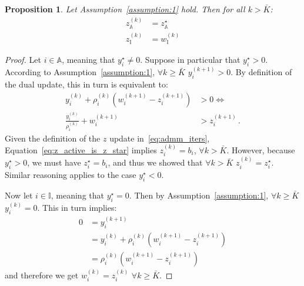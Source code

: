 \documentclass[letterpaper, 10 pt, conference]{ieeeconf}  %
\newtheorem{proposition}{Proposition}
\begin{document}
\begin{proposition}
\label{prop:assumption_1}
Let Assumption~\ref{assumption:1} hold. Then for all $k > \bar{K}$:
\begin{equation}
\begin{aligned}
    z_{\mathbb{A}}^{(k)} &= z_{\mathbb{A}}^{\star} \\
    z_{\mathbb{I}}^{(k)} &= w_{\mathbb{I}}^{(k)}
\end{aligned}
\end{equation}
\end{proposition}
\begin{proof}
Let $i \in \mathbb{A}$, meaning that $y_i^{\star} \neq  0$. Suppose in particular that $y_i^{\star} > 0$. According to Assumption~\ref{assumption:1}, $\forall k \ge \bar{K}$ $y_i^{(k+1)} >0$. By definition of the dual update, this in turn is equivalent to:
\begin{equation}
\label{eq:z_active_is_z_star}
\begin{aligned}
    y_i^{(k)} + \rho_i^{(k)} \left(w_i^{(k+1)} - z_i^{(k+1)} \right) &> 0 \iff \\
    \frac{y_i^{(k)}}{\rho_i^{(k)}} + w_i^{(k+1)} &> z_i^{(k+1)} \,.
\end{aligned}
\end{equation}
Given the definition of the $z$ update in~\eqref{eq:admm_iters}, Equation~\eqref{eq:z_active_is_z_star} implies $z_i^{(k)} = b_i$, $\forall k > \bar{K}$. However, because $y_i^{\star} > 0$, we must have $z_i^{\star} = b_i$, and thus we showed that $\forall k > \bar{K}$ $z_i^{(k)} = z_i^{\star}$. Similar reasoning applies to the case $y_i^{\star} < 0$.

Now let $i \in \mathbb{I}$, meaning that $y_i^{\star} = 0$. Then by Assumption~\ref{assumption:1}, $\forall k \geq \bar{K}$ $y_i^{(k)} = 0$. This in turn implies:
\begin{equation}
\label{eq:z_inactive_is_w}
\begin{aligned}
0 &= y_i^{(k+1)} \\
&= y_i^{(k)} + \rho_i^{(k)} \left(w_i^{(k+1)} - z_i^{(k+1)}\right) \\
&= \rho_i^{(k)} \left(w_i^{(k+1)} - z_i^{(k+1)}\right)
\end{aligned}
\end{equation}
and therefore we get $w_i^{(k)} = z_i^{(k)}$ $\forall k \geq \bar{K}$.
\end{proof}
\end{document}
